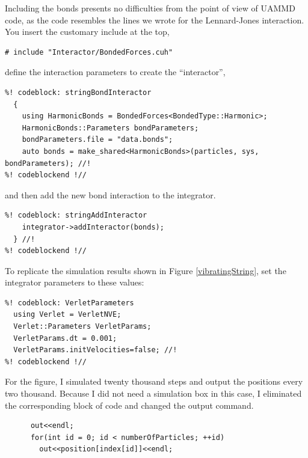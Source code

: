 Including the bonds presents no difficulties from the point of view of UAMMD
code, as the code resembles the lines we wrote for the Lennard-Jones
interaction. You insert the customary include at the top,
\begin{lstlisting}
# include "Interactor/BondedForces.cuh"
\end{lstlisting}
define the interaction parameters to create the ``interactor'',
\begin{lstlisting}
%! codeblock: stringBondInteractor
  {
    using HarmonicBonds = BondedForces<BondedType::Harmonic>;
    HarmonicBonds::Parameters bondParameters;
    bondParameters.file = "data.bonds";
    auto bonds = make_shared<HarmonicBonds>(particles, sys, bondParameters); //!
%! codeblockend !//
\end{lstlisting}
and then add the new bond interaction to the integrator.
\begin{lstlisting}
%! codeblock: stringAddInteractor
    integrator->addInteractor(bonds);
  } //!
%! codeblockend !//
\end{lstlisting}

To replicate the simulation results shown in Figure \ref{vibratingString},
set the integrator parameters to these values:
\begin{lstlisting}
%! codeblock: VerletParameters
  using Verlet = VerletNVE;
  Verlet::Parameters VerletParams;
  VerletParams.dt = 0.001;
  VerletParams.initVelocities=false; //!
%! codeblockend !//
\end{lstlisting}
For the figure, I simulated twenty thousand steps and output the positions every
two thousand. Because I did not need a simulation box in this case, I eliminated
the corresponding block of code and changed the output command.
\begin{lstlisting}
      out<<endl;
      for(int id = 0; id < numberOfParticles; ++id)
        out<<position[index[id]]<<endl;
\end{lstlisting}

